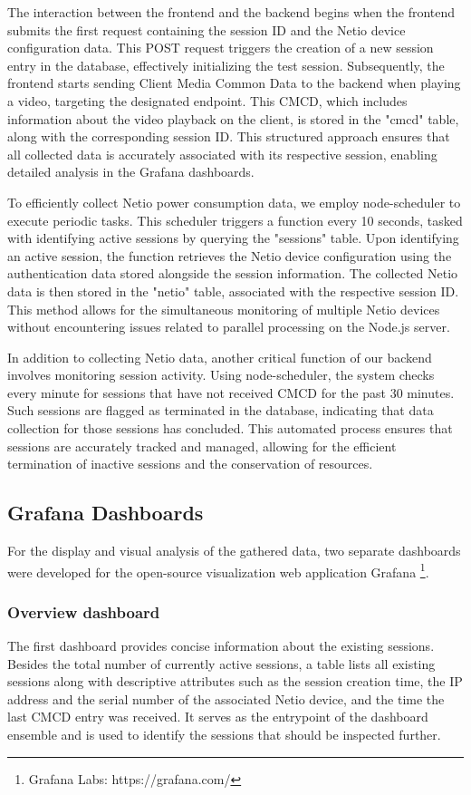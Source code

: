 The interaction between the frontend and the backend begins when the frontend submits the first request containing the session ID and the Netio device configuration data. 
This POST request triggers the creation of a new session entry in the database, effectively initializing the test session.
Subsequently, the frontend starts sending Client Media Common Data to the backend when playing a video, targeting the designated endpoint. 
This CMCD, which includes information about the video playback on the client, is stored in the "cmcd" table, along with the corresponding session ID. 
This structured approach ensures that all collected data is accurately associated with its respective session, enabling detailed analysis in the Grafana dashboards.

To efficiently collect Netio power consumption data, we employ node-scheduler to execute periodic tasks.
This scheduler triggers a function every 10 seconds, tasked with identifying active sessions by querying the "sessions" table. 
Upon identifying an active session, the function retrieves the Netio device configuration using the authentication data stored alongside the session information. 
The collected Netio data is then stored in the "netio" table, associated with the respective session ID.
This method allows for the simultaneous monitoring of multiple Netio devices without encountering issues related to parallel processing on the Node.js server.

In addition to collecting Netio data, another critical function of our backend involves monitoring session activity. 
Using node-scheduler, the system checks every minute for sessions that have not received CMCD for the past 30 minutes. 
Such sessions are flagged as terminated in the database, indicating that data collection for those sessions has concluded. 
This automated process ensures that sessions are accurately tracked and managed, allowing for the efficient termination of inactive sessions and the conservation of resources.

\subsection{Grafana Dashboards}
For the display and visual analysis of the gathered data, two separate dashboards were developed for the open-source visualization web application Grafana \footnote{Grafana Labs: https://grafana.com/}.

\subsubsection{Overview dashboard}
The first dashboard provides concise information about the existing sessions. Besides the total number of currently active sessions, a table lists all existing sessions along with descriptive attributes such as the session creation time, the IP address and the serial number of the associated Netio device, and the time the last CMCD entry was received. It serves as the entrypoint of the dashboard ensemble and is used to identify the sessions that should be inspected further.

